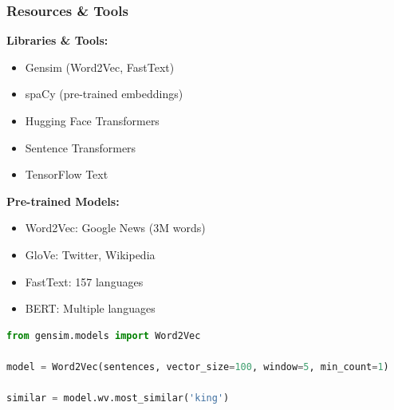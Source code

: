 \begin{frame}[fragile]\frametitle{Resources \& Tools}
\textbf{Libraries \& Tools:}
\begin{itemize}
\item Gensim (Word2Vec, FastText)
\item spaCy (pre-trained embeddings)
\item Hugging Face Transformers
\item Sentence Transformers
\item TensorFlow Text
\end{itemize}

\textbf{Pre-trained Models:}
\begin{itemize}
\item Word2Vec: Google News (3M words)
\item GloVe: Twitter, Wikipedia
\item FastText: 157 languages
\item BERT: Multiple languages
\end{itemize}

\begin{lstlisting}[language=Python]
from gensim.models import Word2Vec

model = Word2Vec(sentences, vector_size=100, window=5, min_count=1)
	
similar = model.wv.most_similar('king')
\end{lstlisting}
\end{frame}

